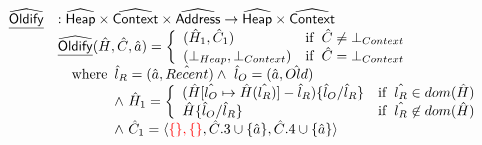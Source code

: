 \[
\begin{array}{ll}

\widehat{\underline{\sf Oldify}} & : \widehat{\mbox{\textsf{Heap}}} \times \widehat{\mbox{\textsf{Context}}} \times \widehat{\mbox{\textsf{Address}}} \rightarrow \widehat{\mbox{\textsf{Heap}}} \times \widehat{\mbox{\textsf{Context}}}\\
 & \widehat{\underline{\sf Oldify}}(\hat{H},\hat{C}, \hat{a}) =
     \left\{
       \begin{array}{ll}
         (\hat{H}_1, \hat{C}_1) & {\rm if}\begin{array}[t]{l}\hat{C} \neq \bot_{Context}\end{array} \\
         (\bot_{Heap}, \bot_{Context}) & {\rm if}\begin{array}[t]{l}\hat{C} = \bot_{Context}\end{array} \\
       \end{array}
     \right.\\
 & \quad{\rm where}\begin{array}[t]{l}
   \hat{l}_R = (\hat{a}, \hat{Recent}) \land\ \hat{l}_O = (\hat{a}, \hat{Old})\\
   \land\ \hat{H}_1 =
     \left\{
       \begin{array}{ll}
         (\hat{H}[\hat{l_O}\mapsto \hat{H}(\hat{l_R})]-\hat{l}_R)\{\hat{l}_O / \hat{l}_R\}
         & {\rm if}\begin{array}[t]{l}\hat{l_R}\in dom(\hat{H})\end{array} \\
         \hat{H}\{\hat{l}_O / \hat{l}_R\}
         & {\rm if}\begin{array}[t]{l}\hat{l_R}\not\in dom(\hat{H})\end{array} \\
       \end{array}
     \right.\\
   \land\ \hat{C}_1 = \langle {\color{red}\{ \}, \{ \}}, \hat{C}.3 \cup \{\hat{a}\}, \hat{C}.4 \cup \{\hat{a}\} \rangle
\end{array}\\\\



\end{array}\]
